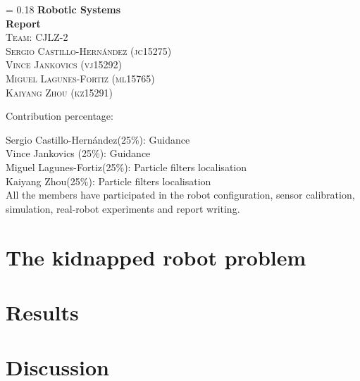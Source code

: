 \documentclass[12pt]{article}
\newcommand{\ass}{Robotic Systems\\ Report}
\newcommand{\name}{ Team: CJLZ-2\\Sergio Castillo-Hernández (jc15275)\\ Vince Jankovics (vj15292)\\ Miguel Lagunes-Fortiz (ml15765)\\ Kaiyang Zhou (kz15291)}
\newcommand*{\titleM}{
\thispagestyle{empty}
\newlength{\drop}
\begingroup%


\drop = 0.18\textheight
\centering
\vspace*{\drop}
\vspace*{\drop}
{\Huge\bfseries \ass}\\[\baselineskip]
{\large\scshape \name}\par
\vfill
Contribution percentage: \par 
Sergio Castillo-Hernández(25\%): Guidance\\ 
Vince Jankovics (25\%): Guidance\\ 
Miguel Lagunes-Fortiz(25\%): Particle filters localisation\\ 
Kaiyang Zhou(25\%): Particle filters localisation\\
All the members have participated in the robot configuration, sensor calibration, simulation, real-robot experiments and report writing. \\
\endgroup

\thispagestyle{empty}
\makebox[\textwidth]{}
\pagebreak
\makebox[\textwidth]{}
\setcounter{page}{0}
}
\begin{document}
	\titleM
	
	
		
	 \label{sec:robot}
	
	
		
	\section{The kidnapped robot problem} \label{sec:method}
		
		
		
		
		
		
 	
 	\section{Results} \label{sec:result}
 	
 		
 		
		
		
		
 		
 	\section{Discussion} \label{sec:discuss}
 
	 
 
 \printbibliography
 
 
 		 	
	 	
\end{document}
